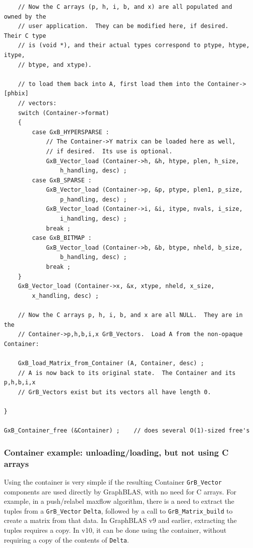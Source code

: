 {\begin{verbatim}
    // Now the C arrays (p, h, i, b, and x) are all populated and owned by the
    // user application.  They can be modified here, if desired.  Their C type
    // is (void *), and their actual types correspond to ptype, htype, itype,
    // btype, and xtype).

    // to load them back into A, first load them into the Container->[phbix]
    // vectors:
    switch (Container->format)
    {
        case GxB_HYPERSPARSE :
            // The Container->Y matrix can be loaded here as well,
            // if desired.  Its use is optional.
            GxB_Vector_load (Container->h, &h, htype, plen, h_size,
                h_handling, desc) ;
        case GxB_SPARSE :
            GxB_Vector_load (Container->p, &p, ptype, plen1, p_size,
                p_handling, desc) ;
            GxB_Vector_load (Container->i, &i, itype, nvals, i_size,
                i_handling, desc) ;
            break ;
        case GxB_BITMAP :
            GxB_Vector_load (Container->b, &b, btype, nheld, b_size,
                b_handling, desc) ;
            break ;
    }
    GxB_Vector_load (Container->x, &x, xtype, nheld, x_size,
        x_handling, desc) ;

    // Now the C arrays p, h, i, b, and x are all NULL.  They are in the
    // Container->p,h,b,i,x GrB_Vectors.  Load A from the non-opaque Container:

    GxB_load_Matrix_from_Container (A, Container, desc) ;
    // A is now back to its original state.  The Container and its p,h,b,i,x
    // GrB_Vectors exist but its vectors all have length 0.

}

GxB_Container_free (&Container) ;    // does several O(1)-sized free's
\end{verbatim}}

\subsubsection{Container example: unloading/loading, but not using C arrays}
\label{container_example2}

Using the container is very simple if the resulting Container \verb'GrB_Vector'
components are used directly by GraphBLAS, with no need for C arrays.  For
example, in a push/relabel maxflow algorithm, there is a need to extract the
tuples from a \verb'GrB_Vector' \verb'Delta', followed by a call to
\verb'GrB_Matrix_build' to create a matrix from that data.  In GraphBLAS v9 and
earlier, extracting the tuples requires a copy.  In v10, it can be done using
the container, without requiring a copy of the contents of \verb'Delta'.

